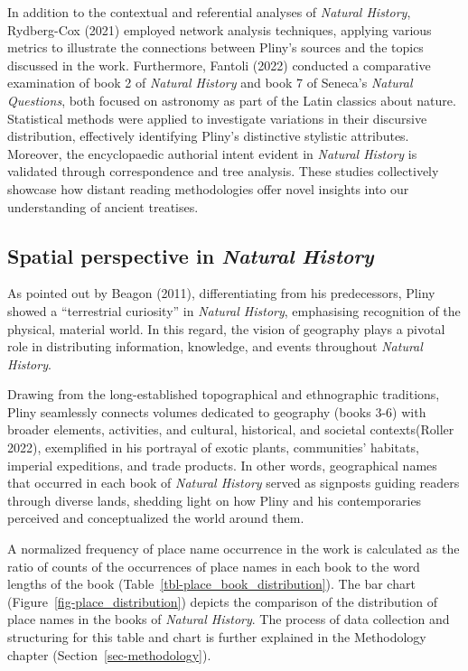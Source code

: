 \documentclass[
  12pt,
]{article}
\begin{document}
In addition to the contextual and referential analyses of \emph{Natural
History}, Rydberg-Cox (2021) employed network analysis techniques,
applying various metrics to illustrate the connections between Pliny's
sources and the topics discussed in the work. Furthermore, Fantoli
(2022) conducted a comparative examination of book 2 of \emph{Natural
History} and book 7 of Seneca's \emph{Natural Questions}, both focused
on astronomy as part of the Latin classics about nature. Statistical
methods were applied to investigate variations in their discursive
distribution, effectively identifying Pliny's distinctive stylistic
attributes. Moreover, the encyclopaedic authorial intent evident in
\emph{Natural History} is validated through correspondence and tree
analysis. These studies collectively showcase how distant reading
methodologies offer novel insights into our understanding of ancient
treatises.

\hypertarget{spatial-perspective-in-natural-history}{%
\subsection{\texorpdfstring{Spatial perspective in \emph{Natural
History}}{Spatial perspective in Natural History}}\label{spatial-perspective-in-natural-history}}

As pointed out by Beagon (2011), differentiating from his predecessors,
Pliny showed a ``terrestrial curiosity'' in \emph{Natural History},
emphasising recognition of the physical, material world. In this regard,
the vision of geography plays a pivotal role in distributing
information, knowledge, and events throughout \emph{Natural History}.

Drawing from the long-established topographical and ethnographic
traditions, Pliny seamlessly connects volumes dedicated to geography
(books 3-6) with broader elements, activities, and cultural, historical,
and societal contexts(Roller 2022), exemplified in his portrayal of
exotic plants, communities' habitats, imperial expeditions, and trade
products. In other words, geographical names that occurred in each book
of \emph{Natural History} served as signposts guiding readers through
diverse lands, shedding light on how Pliny and his contemporaries
perceived and conceptualized the world around them.

A normalized frequency of place name occurrence in the work is
calculated as the ratio of counts of the occurrences of place names in
each book to the word lengths of the book
(Table~\ref{tbl-place_book_distribution}). The bar chart
(Figure~\ref{fig-place_distribution}) depicts the comparison of the
distribution of place names in the books of \emph{Natural History}. The
process of data collection and structuring for this table and chart is
further explained in the Methodology chapter
(Section~\ref{sec-methodology}).
\end{document}
